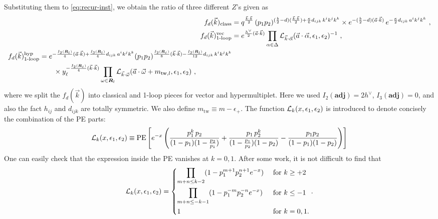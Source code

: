 \documentclass[letterpaper, 11pt]{article}
\def\CL{{\cal L}}
\def\a{\alpha}
\def\e{\epsilon}
\def\k{\kappa}
\def\w{\omega}
\def\D{\Delta}
\begin{document}
Substituting them to \eqref{eq:recur-inst}, we obtain the ratio of three different $Z$'s given as
\begin{align}
 f_d(\vec{k})_{\text{class}} &=  q^{\frac{\vec{k}\cdot\vec{k}}{2} } \, 
  (p_1p_2)^{(\frac{b}{2}-d) (\frac{\vec{k}\cdot\vec{k}}{2}) +\frac{\k}{6}d_{ijk}\,k^ik^jk^k} \times  e^{-(\frac{b}{2}-d)(\vec{a}\cdot\vec{k})}\,
  e^{-\frac{\kappa}{2}d_{ijk}\,a^ik^jk^k} \ , \\
  f_d(\vec{k})_{\text{1-loop}}^{\text{vec}}&= e^{\frac{h^\vee}{2}(\vec{a}\cdot\vec{k})}  \prod_{\a \in \D} \CL_{\vec{k} \cdot \vec{\a}} (\vec{a}\cdot\vec{\alpha}, \epsilon_1, \epsilon_2)^{-1} \ , \\
 \begin{split}
  f_d(\vec{k})_{\text{1-loop}}^{\text{hyp}} &= e^{-\frac{I_2(\boldsymbol{R}_l)}{4}(\vec{a}\cdot\vec{k})+\frac{I_3(\boldsymbol{R}_l)}{4}d_{ijk}\,a^ik^jk^k} (p_1p_2)^{\frac{I_2(\boldsymbol{R}_\ell)}{8}(\vec{k}\cdot\vec{k})-\frac{I_3(\boldsymbol{R}_l)}{12}d_{ijk}\,k^ik^jk^k} \\
   &\qquad \times   y_\ell^{-\frac{I_2(\boldsymbol{R}_\ell)}{4}(\vec{k}\cdot\vec{k})} \prod_{\w \in \boldsymbol{R}_l} \CL_{\vec{k}\cdot\vec{\w}}(\vec{a}\cdot \vec{\w} + m_{\text{tw},l}, \e_1,\e_2) \ , 
\end{split}
\end{align}
where we split the $f_d(\vec{k})$ into classical and 1-loop pieces for vector and hypermultiplet. 
Here we used $I_2(\textbf{adj}) = 2h^\vee$, $I_3(\textbf{adj})=0$, and also 
the fact $h_{ij}$ and $d_{ijk}$ are totally symmetric. We also define $m_{\text{tw}} \equiv m - \e_+$. The function $\CL_k (x,\e_1,\e_2)$ is introduced to denote concisely the combination of the PE parts:
\begin{align}
  \CL_k (x,\e_1,\e_2) \equiv \text{PE}\left[ e^{-x} \left(\frac{p_1^k \, p_2}{(1-p_1)(1-\frac{p_2}{p_1})}+\frac{p_1\, p_2^k}{(1-\frac{p_1}{p_2})(1-p_2)}-\frac{p_1p_2}{(1-p_1)(1-p_2)}\right) \right]
\end{align}
One can easily check that the expression inside the PE vanishes at $k=0, 1$. After some work, it is not difficult to find that 
\begin{align}
  \CL_k (x,\e_1,\e_2) =
   \begin{dcases}
   \prod_{m+n \le k-2}(1-p_1^{m+1} p_2^{n+1}e^{-x}) & \text{ for } k\geq +2 \\
   \prod_{m+n \le -k-1}(1-p_1^{-m} p_2^{-n}e^{-x}) & \text{ for } k\leq-1 \\
   1 & \text{ for } k=0, 1.
   \end{dcases} . 
\end{align}
\end{document}
